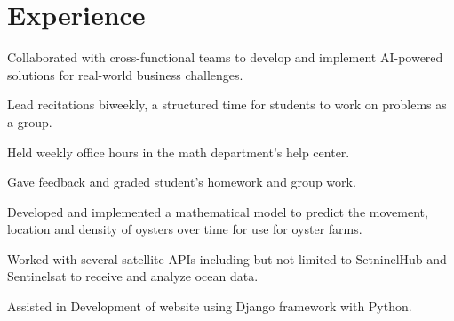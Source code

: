 \documentclass[letterpaper]{deedy-resume} %
\begin{document}
\begin{minipage}[t]{0.66\textwidth} %


\section{Experience}


\vspace{\topsep} %
\begin{tightitemize}
\item Collaborated with cross-functional teams to develop and implement AI-powered solutions for real-world business challenges.
\end{tightitemize}

\sectionspace %



\vspace{\topsep} %
\begin{tightitemize}
\item Lead recitations biweekly, a structured time for students to work on problems as a group.
\item Held weekly office hours in the math department's help center.
\item Gave feedback and graded student's homework and group work.
\end{tightitemize}

\sectionspace %



\vspace{\topsep} %
\begin{tightitemize}
\item Developed and implemented a mathematical model to predict the movement, location and density of oysters over time for use for oyster farms.
\item Worked with several satellite APIs including but not limited to 
SetninelHub and Sentinelsat to receive and analyze ocean data.
\item Assisted in Development of website using Django framework with Python.
\end{tightitemize}


\end{minipage}
\end{document}
